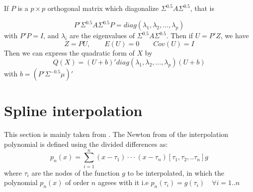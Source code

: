 \documentclass[12pt]{paper}
\begin{document}
If $P$ is a $p \times p$ orthogonal matrix which diagonalize $\Sigma^{0.5}A\Sigma^{0.5}$, that is 

\begin{equation*}
P'\Sigma^{0.5}A\Sigma^{0.5}P = diag(\lambda_1,\lambda_2,...,\lambda_p)
\end{equation*}
with $P'P=I$, and $\lambda_i$ are the eigenvalues of $\Sigma^{0.5} A \Sigma^{0.5}$.  Then if $U=P'Z$, we have 
\begin{equation*}
Z=PU, \qquad E(U)=0 \qquad Cov(U) = I
\end{equation*}
Then we can express the quadratic form of $X$ by 
\begin{equation}
Q(X) = (U+b)'diag(\lambda_1,\lambda_2,...,\lambda_p)(U+b)
\end{equation}
with $b = (P'\Sigma^{-0.5}\mu)'$ 

\section{Spline interpolation}\label{section_splineInterpolation}
This section is mainly taken from \cite{de1978practical}. The Newton from of the interpolation polynomial is defined using the divided differences as:
\begin{equation*}
p_n(x)=\sum_{i=1}^{n}(x-\tau_1)\cdot\cdot\cdot(x-\tau_n)[\tau_1,\tau_2,..\tau_n]g
\end{equation*}
where $\tau_i$ are the nodes of the function $g$ to be interpolated, in which the polynomial $p_n(x) $ of order $n$ agrees with it i.e $p_n(\tau_i)=g(\tau_i)\quad \forall i=1..n$



\end{document}
